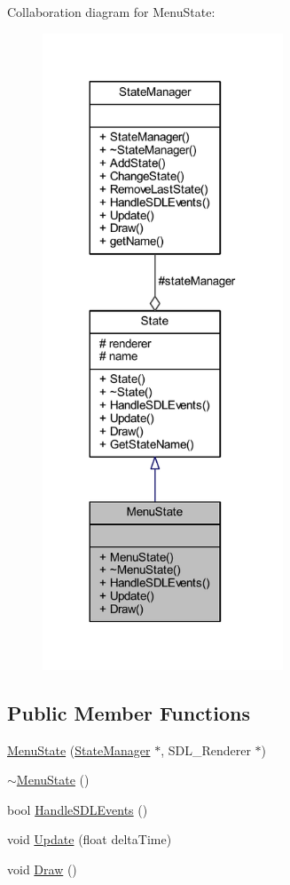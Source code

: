 Collaboration diagram for Menu\+State\+:
\nopagebreak
\begin{figure}[H]
\begin{center}
\leavevmode
\includegraphics[width=203pt]{class_menu_state__coll__graph}
\end{center}
\end{figure}
\subsection*{Public Member Functions}
\begin{DoxyCompactItemize}
\item 
\hyperlink{class_menu_state_a0cfcaba0ed63cdbcaf2d517e6bfbd2a2}{Menu\+State} (\hyperlink{class_state_manager}{State\+Manager} $\ast$, S\+D\+L\+\_\+\+Renderer $\ast$)
\item 
\hyperlink{class_menu_state_a58aea91a44436c5bba575c5de755a5bc}{$\sim$\+Menu\+State} ()
\item 
bool \hyperlink{class_menu_state_abab3b8017d47c6d6134cbdfb8e0c7580}{Handle\+S\+D\+L\+Events} ()
\item 
void \hyperlink{class_menu_state_a2ee9793bd50c42d8c7ce4cab62fbeba6}{Update} (float delta\+Time)
\item 
void \hyperlink{class_menu_state_a0fc92c6a39ef316552f1308c188871c6}{Draw} ()
\end{DoxyCompactItemize}
